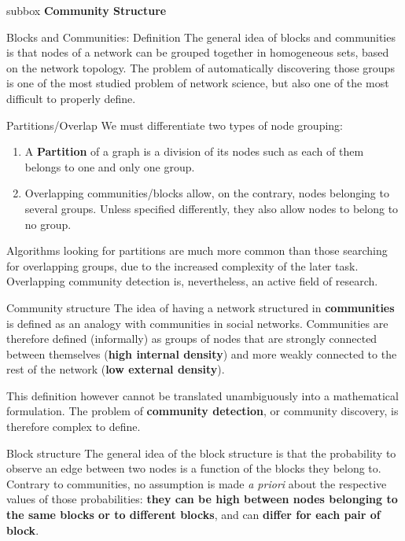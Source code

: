 \begin{subbox}{subbox}{}
    \centering
    \Large{\textbf{Community Structure}}
\end{subbox}

\begin{textbox}{Blocks and Communities: Definition}
    The general idea of blocks and communities is that nodes of a network can be grouped together in homogeneous sets, based on the network topology. The problem of automatically discovering those groups is one of the most studied problem of network science, but also one of the most difficult to properly define.
\end{textbox}

\begin{textbox}{Partitions/Overlap}
    We must differentiate two types of node grouping:
    \begin{enumerate}
        \item A \textbf{Partition} of a graph is a division of its nodes such as each of them belongs to one and only one group.
        \item Overlapping communities/blocks allow, on the contrary, nodes belonging to several groups. Unless specified differently, they also allow nodes to belong to no group.
    \end{enumerate}
    Algorithms looking for partitions are much more common than those searching for overlapping groups, due to the increased complexity of the later task. Overlapping community detection is, nevertheless, an active field of research.
\end{textbox}

\begin{textbox}{Community structure}
    The idea of having a network structured in \textbf{communities} is defined as an analogy with communities in social networks. Communities are therefore defined (informally) as groups of nodes that are strongly connected between themselves (\textbf{high internal density}) and more weakly connected to the rest of the network (\textbf{low external density}).

    This definition however cannot be translated unambiguously into a mathematical formulation. The problem of \textbf{community detection}, or community discovery, is therefore complex to define.
\end{textbox}

\begin{textbox}{Block structure}
    The general idea of the block structure is that the probability to observe an edge between two nodes is a function of the blocks they belong to. Contrary to communities, no assumption is made \textit{a priori} about the respective values of those probabilities: \textbf{they can be high between nodes belonging to the same blocks or to different blocks}, and can \textbf{differ for each pair of block}.

\end{textbox}

